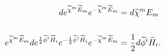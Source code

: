 \begin{equation}
\begin{aligned}
de^{\widetilde{\chi }^{m}\widetilde{E}_{m}}e^{-\widetilde{%
\chi }^{m}\widetilde{E}_{m}}&=d\widetilde{\chi }^{m}E_{m}\\
\\
e^{\widetilde{\chi }^{m}\widetilde{E}_{m}}de^{\frac{1}{2%
}\widetilde{\phi }^{i}\widetilde{H}_{i}}e^{-\frac{1}{2}\widetilde{%
\phi }^{i}\widetilde{H}_{i}}e^{-\widetilde{\chi }^{m}\widetilde{E}%
_{m}}&=\frac{1}{2}d\widetilde{\phi }^{i}\widetilde{H}_{i}.
\end{aligned}
\end{equation}

